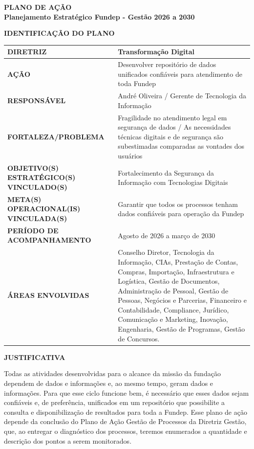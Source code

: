 \documentclass[12pt,a4paper]{article}
\newcommand{\secao}[1]{%
  \par\vspace{6pt}%
  {\noindent\bfseries\color{azulTitulo}\fontsize{13}{16}\selectfont #1}%
  \par\vspace{2pt}%
}
\begin{document}
\thispagestyle{empty}

\begin{center}
  {\bfseries\color{azulTitulo}\fontsize{17}{20}\selectfont PLANO DE AÇÃO}\\[6pt]
  {\bfseries\color{azulTitulo}\fontsize{13}{16}\selectfont Planejamento Estratégico Fundep - Gestão 2026 a 2030}
\end{center}

\secao{IDENTIFICAÇÃO DO PLANO}

\begingroup
\small
{}
\renewcommand{\arraystretch}{1.35}
\begin{tabular}{|>{\cellcolor{azulClaro}\bfseries}p{}|p{}|}
\hline
DIRETRIZ & Transformação Digital \\
\hline
AÇÃO & Desenvolver repositório de dados unificados confiáveis para atendimento de toda Fundep \\
\hline
RESPONSÁVEL & André Oliveira / Gerente de Tecnologia da Informação \\
\hline
FORTALEZA/PROBLEMA & Fragilidade no atendimento legal em segurança de dados / As necessidades técnicas digitais e de segurança são subestimadas comparadas as vontades dos usuários \\
\hline
OBJETIVO(S) ESTRATÉGICO(S) VINCULADO(S) & Fortalecimento da Segurança da Informação com Tecnologias Digitais \\
\hline
META(S) OPERACIONAL(IS) VINCULADA(S) & Garantir que todos os processos tenham dados confiáveis para operação da Fundep \\
\hline
PERÍODO DE ACOMPANHAMENTO & Agosto de 2026 a março de 2030 \\
\hline
ÁREAS ENVOLVIDAS & Conselho Diretor, Tecnologia da Informação, CIAs, Prestação de Contas, Compras, Importação, Infraestrutura e Logística, Gestão de Documentos, Administração de Pessoal, Gestão de Pessoas, Negócios e Parcerias, Financeiro e Contabilidade, Compliance, Jurídico, Comunicação e Marketing, Inovação, Engenharia, Gestão de Programas, Gestão de Concursos. \\
\hline
\end{tabular}
\endgroup

\secao{JUSTIFICATIVA}

Todas as atividades desenvolvidas para o alcance da missão da fundação dependem de dados e informações e, ao mesmo tempo, geram dados e informações. Para que esse ciclo funcione bem, é necessário que esses dados sejam confiáveis e, de preferência, unificados em um repositório que possibilite a consulta e disponibilização de resultados para toda a Fundep. Esse plano de ação depende da conclusão do Plano de Ação Gestão de Processos da Diretriz Gestão, que, ao entregar o diagnóstico dos processos, teremos enumerados a quantidade e descrição dos pontos a serem monitorados.
\end{document}
